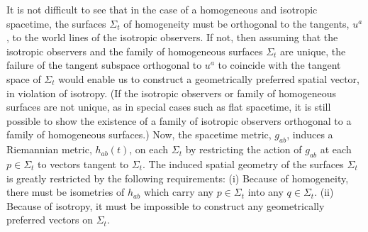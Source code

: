 It is not difficult to see that in the case of a homogeneous and isotropic spacetime,
the surfaces \(\Sigma_t\) of homogeneity must be orthogonal to the tangents,
\(u^a\), to the world lines of the isotropic observers. If not, then assuming that the
isotropic observers and the family of homogeneous surfaces \(\Sigma_t\) are unique,
the failure of the tangent subspace orthogonal to \(u^a\) to coincide with the tangent
space of \(\Sigma_t\) would enable us to construct a geometrically preferred spatial
vector, in violation of isotropy. (If the isotropic observers or family of homogeneous
surfaces are not unique, as in special cases such as flat spacetime, it is still possible
to show the existence of a family of isotropic observers orthogonal to a family of
homogeneous surfaces.) Now, the spacetime metric, \(g_{ab}\), induces a Riemannian
metric, \(h_{ab}(t)\), on each \(\Sigma_t\) by restricting the action of \(g_{ab}\) at each
\(p\in\Sigma_t\) to vectors tangent to \(\Sigma_t\). The induced spatial geometry of
the surfaces \(\Sigma_t\) is greatly restricted by the following requirements: (i)
Because of homogeneity, there must be isometries of \(h_{ab}\) which carry any
\(p\in\Sigma_t\) into any \(q\in\Sigma_t\). (ii) Because of isotropy, it must be
impossible to construct any geometrically preferred vectors on \(\Sigma_t\).

